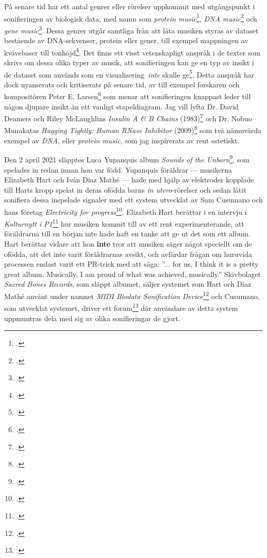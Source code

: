 \documentclass[11pt, a4paper]{article} %
\begin{document}
På senare tid har ett antal genrer eller rörelser uppkommit med utgångspunkt i sonifieringen av biologisk data, med namn som \emph{protein music}\footcite{king_pm_1996}, \emph{DNA music}\footcite{k_kawazoe_study_2001} och \emph{gene music}\footcite{munakata_gene_1995}. Dessa genrer utgår samtliga från att låta musiken styras av dataset bestående av DNA-sekvenser, protein eller gener, till exempel mappningen av kvävebaser till tonhöjd\footcite{shi_electronic_2007}. Det finns ett visst vetenskapligt anspråk i de texter som skrivs om dessa olika typer av musik, att sonifieringen kan ge en typ av insikt i de dataset som används som en visualisering \emph{inte} skulle ge\footcite{king_pm_1996}. Detta anspråk har dock nyanserats och kritiserats på senare tid, av till exempel forskaren och kompositören Peter E. Larsen\footcite{larsen_more_2016} som menar att sonifieringen knappast leder till någon djupare insikt än ett vanligt stapeldiagram. Jag vill lyfta Dr. David Deamers och Riley McLaughlins \emph{Insulin A \& B Chains} (1983)\footcite{deamer_insulin_1983} och Dr. Nobuo Munakatas \emph{Hugging Tightly: Human RNase Inhibitor} (2009)\footcite{munakata_hugging_2009} som två nämnvärda exempel av \emph{DNA}, eller \emph{protein music}, som jag inspirerats av rent estetiskt.

Den 2 april 2021 släpptes Luca Yupanquis album \emph{Sounds of the Unborn}\footcite{yupanqui_sounds_2021}, som spelades in redan innan hon var född. Yupanquis föräldrar --- musikerna Elizabeth Hart och Iván Diaz Mathé --- hade med hjälp av elektroder kopplade till Harts kropp spelat in deras ofödda barns \emph{in utero}-rörelser och sedan låtit sonifiera dessa inspelade signaler med ett system utvecklat av Sam Cusumano och hans företag \emph{Electricity for progress}\footcite{noauthor_electricity_nodate}. Elizabeth Hart berättar i en intervju i \emph{Kulturnytt i P1}\footcite{eklund_duo_2021} hur musiken kommit till av ett rent experimenterande, att föräldrarna till en början inte hade haft en tanke att ge ut det som ett album. Hart berättar vidare att hon \textbf{inte} tror att musiken säger något speciellt om de ofödda, att det inte varit föräldrarnas avsikt, och avfärdar frågan om huruvida processen endast varit ett PR-trick med att säga: ''... for us, I think it is a pretty great album. Musically, I am proud of what was achieved, musically.'' Skivbolaget \emph{Sacred Bones Records}, som släppt albumet, säljer systemet som Hart och Diaz Mathé använt under namnet \emph{MIDI Biodata Sonification Device}\footcite{noauthor_midi_nodate} och Cusumano, som utvecklat systemet, driver ett forum\footcite{noauthor_biodata_nodate} där användare av detta system uppmuntras dela med sig av olika sonifieringar de gjort. 
\end{document}

